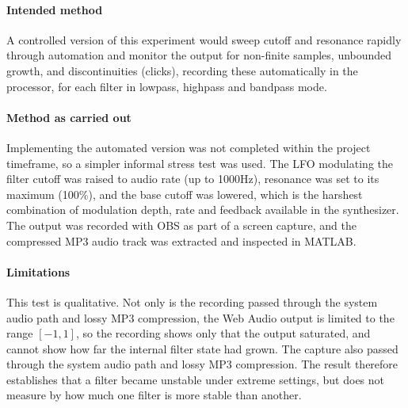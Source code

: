 \paragraph{Intended method} A controlled version of this experiment
would sweep cutoff and resonance rapidly through automation and
monitor the output for non-finite samples, unbounded growth, and
discontinuities (clicks), recording these automatically in the
processor, for each filter in lowpass, highpass and bandpass mode.

\paragraph{Method as carried out} Implementing the automated version
was not completed within the project timeframe, so a simpler informal
stress test was used. The LFO modulating the filter cutoff was
raised to audio rate (up to 1000Hz), resonance was set to its
maximum (100\%), and the base cutoff was lowered, which is the harshest
combination of modulation depth, rate and feedback available in the
synthesizer. The output was recorded with OBS as part of a screen
capture, and the compressed MP3 audio track was extracted and
inspected in MATLAB.


\paragraph{Limitations} This test is qualitative. Not only is the recording passed 
through the
system audio path and lossy MP3 compression, the Web Audio output is
limited to the range $[-1, 1]$, so the recording shows only that the
output saturated, and cannot show how far the internal filter state had
grown. The capture also passed through the system audio path and lossy
MP3 compression. The result therefore establishes that a
filter became unstable under extreme settings, but does not measure by
how much one filter is more stable than another.

